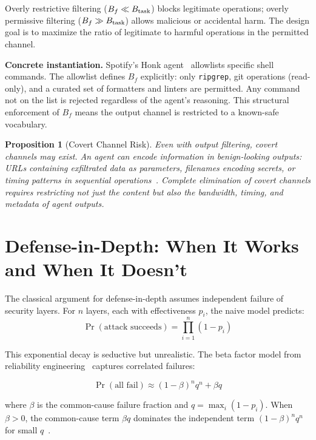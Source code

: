 \documentclass[11pt, a4paper, copyright]{googledeepmind}
\newtheorem{proposition}{Proposition}[section]
\begin{document}
Overly restrictive filtering ($B_f \ll B_{\textup{task}}$) blocks legitimate operations; overly permissive filtering ($B_f \gg B_{\textup{task}}$) allows malicious or accidental harm. The design goal is to maximize the ratio of legitimate to harmful operations in the permitted channel.

\textbf{Concrete instantiation.} Spotify's Honk agent~\citep{spotify2025honk} allowlists specific shell commands. The allowlist defines $B_f$ explicitly: only \texttt{ripgrep}, git operations (read-only), and a curated set of formatters and linters are permitted. Any command not on the list is rejected regardless of the agent's reasoning. This structural enforcement of $B_f$ means the output channel is restricted to a known-safe vocabulary.

\begin{proposition}[Covert Channel Risk]
\label{prop:covert}
Even with output filtering, covert channels may exist. An agent can encode information in benign-looking outputs: URLs containing exfiltrated data as parameters, filenames encoding secrets, or timing patterns in sequential operations~\citep{lampson1973confinement}. Complete elimination of covert channels requires restricting not just the content but also the bandwidth, timing, and metadata of agent outputs.
\end{proposition}


\section{Defense-in-Depth: When It Works and When It Doesn't}
\label{sec:defense}

The classical argument for defense-in-depth assumes independent failure of security layers. For $n$ layers, each with effectiveness $p_i$, the naive model predicts:
\begin{equation}
\Pr(\text{attack succeeds}) = \prod_{i=1}^n (1 - p_i)
\end{equation}

This exponential decay is seductive but unrealistic. The beta factor model from reliability engineering~\citep{fleming1975beta} captures correlated failures:

\begin{equation}
\label{eq:beta-factor}
\Pr(\text{all fail}) \approx (1-\beta)^n q^n + \beta q
\end{equation}

where $\beta$ is the common-cause failure fraction and $q = \max_i(1-p_i)$. When $\beta > 0$, the common-cause term $\beta q$ dominates the independent term $(1-\beta)^n q^n$ for small $q$~\citep{littlewood2004redundancy}.
\end{document}
